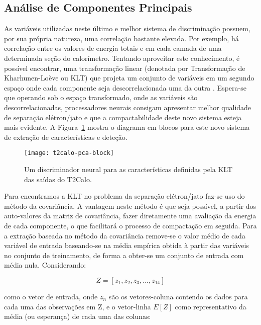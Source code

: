 \subsection{Análise de Componentes Principais}

As variáveis utilizadas neste último e melhor sistema de discriminação
possuem, por sua própria natureza, uma correlação bastante elevada. Por
exemplo, há correlação entre os valores de energia totais e em cada camada de
uma determinada seção do calorímetro. Tentando aproveitar este conhecimento, é
possível encontrar, uma transformação linear (denotada por Transformação de
Kharhunen-Loève ou KLT) que projeta um conjunto de variáveis em um segundo
espaço onde cada componente seja descorrelacionada uma da outra
\cite{haykin}. Espera-se que operando sob o espaço transformado, onde as
variáveis são descorrelacionadas, processadores neurais consigam apresentar
melhor qualidade de separação elétron/jato e que a compactabilidade deste novo
sistema esteja mais evidente. A Figura~\ref{fig:t2calo-pca} mostra o diagrama
em blocos para este novo sistema de extração de características e deteção.

\begin{figure}
\begin{center}
\texttt{[image: t2calo-pca-block]}
\end{center}
\caption{Um discriminador neural para as características definidas pela KLT
das saídas do T2Calo.}
\label{fig:t2calo-pca}
\end{figure}

Para encontramos a KLT no problema da separação elétron/jato faz-se uso do
método da covariância. A vantagem neste método é que seja possível, a partir
dos auto-valores da matriz de covariância, fazer diretamente uma avaliação da
energia de cada componente, o que facilitará o processo de compactação em
seguida. Para a extração baseada no método da covariância remove-se o valor
médio de cada variável de entrada baseando-se na média empírica obtida à
partir das variáveis no conjunto de treinamento, de forma a obter-se um
conjunto de entrada com média nula. Considerando:

\begin{equation}
Z = [z_1, z_2, z_3, ..., z_{14}]
\end{equation}

\noindent como o vetor de entrada, onde $z_n$ são os vetores-coluna contendo
os dados para cada uma das observações em Z, e o vetor-linha $E[Z]$ como
representativo da média (ou esperança) de cada uma das colunas:


